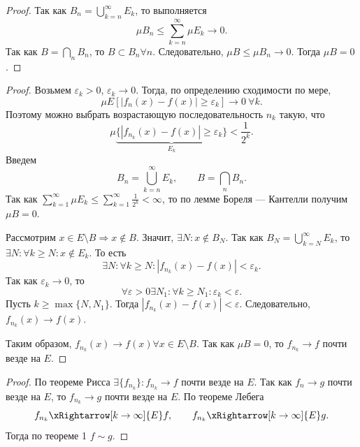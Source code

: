 \documentclass[12pt,a4paper]{report}
\begin{document}


\begin{proof}
    Так как $B_n=\bigcup_{k=n}^{\infty}E_k$, то выполняется
    \[
    \mu B_n\leq\sum_{k=n}^{\infty}\mu E_k\to0.
    \]
    Так как $B=\bigcap_n B_n$, то $B\subset B_n \forall n$. Следовательно, $\mu B\leq\mu B_n\to0$. Тогда $\mu B=0$.
\end{proof}


\begin{proof}
    Возьмем $\varepsilon_k>0$, $\varepsilon_k\to0$. Тогда, по определению сходимости по мере,
    \[
    \mu E[|f_n(x)-f(x)|\geq\varepsilon_k]\to0 \ \forall k.
    \]
    Поэтому можно выбрать возрастающую последовательность $n_k$ такую, что
    \[
    \mu\underbrace{\{|f_{n_k}(x)-f(x)|\geq\varepsilon_k\}}_{E_k}<\frac{1}{2^k}.
    \]
    Введем
    \[
    B_n=\bigcup_{k=n}^{\infty}E_k, \qquad B=\bigcap_n B_n.
    \]
    Так как $\sum_{k=1}^{\infty}\mu E_k\leq\sum_{k=1}^{\infty}\frac{1}{2^k}<\infty$, то по лемме Бореля --- Кантелли получим $\mu B=0$.

    Рассмотрим $x\in E\setminus B\Rightarrow x\notin B$. Значит, $\exists N\colon x\notin B_N$. Так как $B_N=\bigcup_{k=N}^{\infty}E_k$, то $\exists N\colon \forall k\geq N\colon x\notin E_k$.
    То есть
    \[
    \exists N\colon \forall k\geq N\colon |f_{n_k}(x)-f(x)|<\varepsilon_k.
    \]
    Так как $\varepsilon_k\to0$, то
    \[
    \forall \varepsilon>0 \exists N_1\colon \forall k\geq N_1\colon \varepsilon_k<\varepsilon.
    \]
    Пусть $k\geq\max\{N,N_1\}$. Тогда $|f_{n_k}(x)-f(x)|<\varepsilon$. Следовательно, $f_{n_k}(x)\to f(x)$.

    Таким образом, $f_{n_k}(x)\to f(x) \forall x\in E\setminus B$. Так как $\mu B=0$, то $f_{n_k}\to f$ почти везде на $E$.
\end{proof}


\begin{proof}
    По теореме Рисса $\exists \{f_{n_k}\}\colon f_{n_k}\to f$ почти везде на $E$. Так как $f_n\to g$ почти везде на $E$, то $f_{n_k}\to g$ почти везде на $E$.
    По теореме Лебега
    \[
    f_{n_k}\xRightarrow[k\to\infty]{E}f, \qquad
    f_{n_k}\xRightarrow[k\to\infty]{E}g.
    \]
    Тогда по теореме 1 $f\sim g$.
\end{proof}
\end{document}
